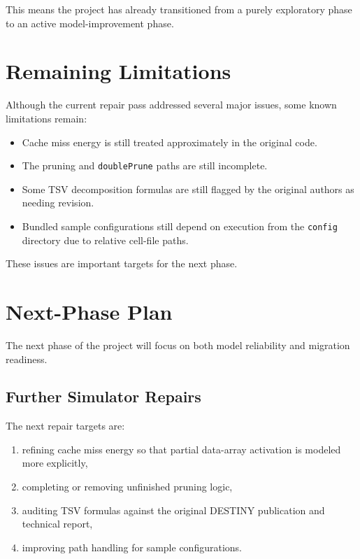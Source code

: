 \documentclass[11pt]{article}
\begin{document}
This means the project has already transitioned from a purely exploratory phase to an active model-improvement phase.

\section{Remaining Limitations}

Although the current repair pass addressed several major issues, some known limitations remain:

\begin{itemize}[leftmargin=1.5em]
    \item Cache miss energy is still treated approximately in the original code.
    \item The pruning and \texttt{doublePrune} paths are still incomplete.
    \item Some TSV decomposition formulas are still flagged by the original authors as needing revision.
    \item Bundled sample configurations still depend on execution from the \texttt{config} directory due to relative cell-file paths.
\end{itemize}

These issues are important targets for the next phase.

\section{Next-Phase Plan}

The next phase of the project will focus on both model reliability and migration readiness.

\subsection{Further Simulator Repairs}

The next repair targets are:

\begin{enumerate}[leftmargin=1.5em]
    \item refining cache miss energy so that partial data-array activation is modeled more explicitly,
    \item completing or removing unfinished pruning logic,
    \item auditing TSV formulas against the original DESTINY publication and technical report,
    \item improving path handling for sample configurations.
\end{enumerate}
\end{document}
